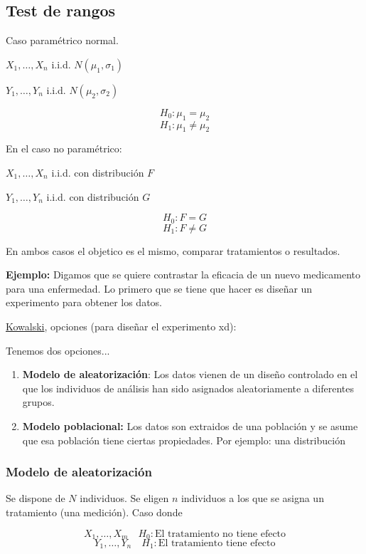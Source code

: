 \subsection{Test de rangos}

Caso paramétrico normal.

$X_1,\dots,X_n$ i.i.d. $N(\mu_1,\sigma_1)$

$Y_1,\dots,Y_n$ i.i.d. $N(\mu_2,\sigma_2)$

\[
    H_0:\mu_1=\mu_2
\]
\[
    H_1: \mu_1 \neq \mu_2
\]

En el caso no paramétrico:

$X_1,\dots,X_n$ i.i.d. con distribución $F$

$Y_1,\dots,Y_n$ i.i.d. con distribución $G$

\[
    H_0:F=G
\]
\[
    H_1: F \neq G
\]

En ambos casos el objetico es el mismo, comparar tratamientos o resultados.

\textbf{Ejemplo:} 
Digamos que se quiere contrastar la eficacia de un nuevo medicamento para una enfermedad.
Lo primero que se tiene que hacer es diseñar un experimento para obtener los datos.

\begin{center}
    \href{https://media.tenor.com/lsbTX_Avt2AAAAAM/brushing-teeth-kowalski.gif}{Kowalski}, opciones (para diseñar el experimento xd):
\end{center}

\noindent Tenemos dos opciones...
\begin{enumerate}
    \item \textbf{Modelo de aleatorización}: Los datos vienen de un diseño controlado en el que los 
    individuos de análisis han sido asignados aleatoriamente a diferentes grupos.
    \item \textbf{Modelo poblacional:} Los datos son extraidos de una población y se asume que esa población tiene ciertas propiedades. 
    Por ejemplo: una distribución
\end{enumerate}

\subsubsection{Modelo de aleatorización}

Se dispone de $N$ individuos. Se eligen $n$ individuos a los que se asigna un tratamiento (una medición).
Caso donde

\[
    X_1,\dots,X_m \quad H_0: \text{El tratamiento no tiene efecto} 
\]
\[
    Y_1,\dots,Y_n \quad H_1: \text{El tratamiento tiene efecto} 
\]

